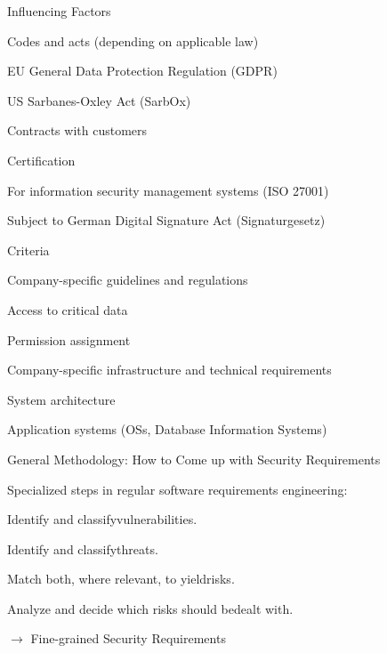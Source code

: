 \documentclass[a4paper]{article}
\begin{document}
\begin{multicols}{3}
    Influencing Factors
    \begin{itemize*}
        \item Codes and acts (depending on applicable law)
        \begin{itemize*}
            \item EU General Data Protection Regulation (GDPR)
            \item US Sarbanes-Oxley Act (SarbOx)
        \end{itemize*}
        \item Contracts with customers
        \item Certification
        \begin{itemize*}
            \item For information security management systems (ISO 27001)
            \item Subject to German Digital Signature Act (Signaturgesetz)
        \end{itemize*}
        \item Criteria
        \item Company-specific guidelines and regulations
        \begin{itemize*}
            \item Access to critical data
            \item Permission assignment
        \end{itemize*}
        \item Company-specific infrastructure and technical requirements
        \begin{itemize*}
            \item System architecture
            \item Application systems (OSs, Database Information Systems)
        \end{itemize*}
    \end{itemize*}

    General Methodology: How to Come up with Security Requirements

    Specialized steps in regular software requirements engineering:
    \begin{enumerate*}
        \item Identify and classifyvulnerabilities.
        \item Identify and classifythreats.
        \item Match both, where relevant, to yieldrisks.
        \item Analyze and decide which risks should bedealt with.
    \end{enumerate*}
    $\rightarrow$ Fine-grained Security Requirements


\end{multicols}
\end{document}
